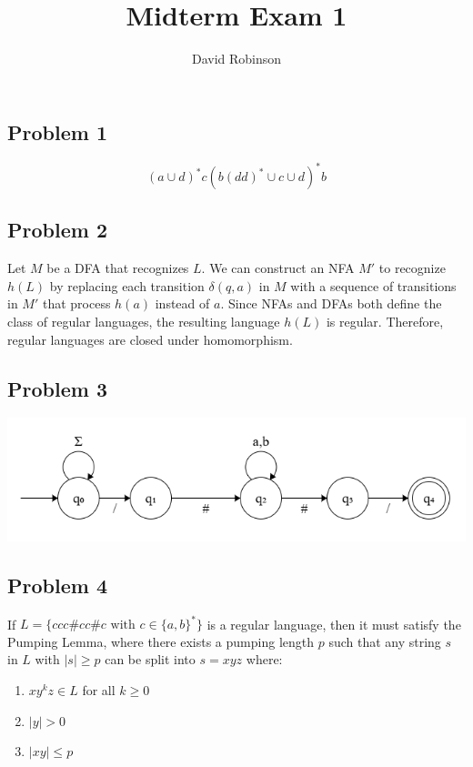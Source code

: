 \documentclass{article}
\title{Midterm Exam 1}
\author{David Robinson}
\date{}
\begin{document}
\maketitle

\subsection*{Problem 1}

\[{(a\cup d)}^* c{(b{(dd)}^*\cup c\cup d)}^* b\]

\subsection*{Problem 2}

Let $M$ be a DFA that recognizes $L$. We can construct an NFA $M'$ to recognize $h(L)$ by replacing each transition $\delta(q,a)$ in $M$ with a sequence of transitions in $M'$ that process $h(a)$ instead of $a$. Since NFAs and DFAs both define the class of regular languages, the resulting language $h(L)$ is regular. Therefore, regular languages are closed under homomorphism.


\subsection*{Problem 3}

\begin{center}
\includegraphics[scale=0.5]{exam1-1.png}
\end{center}

\subsection*{Problem 4}

If $L=\{ccc\#cc\#c\text{ with } c\in{\{a,b\}}^*\}$ is a regular language, then it must satisfy the Pumping Lemma, where there exists a pumping length $p$ such that any string $s$ in $L$ with $|s|\geq p$ can be split into $s=xyz$ where:
\begin{enumerate}
    \item $xy^k z\in L$ for all $k\geq 0$
    \item $|y|>0$
    \item $|xy|\leq p$
\end{enumerate}
\end{document}
